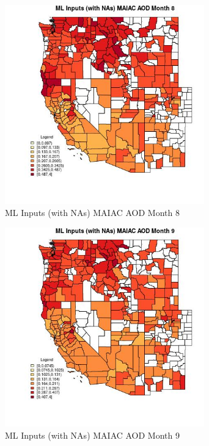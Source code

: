 \begin{figure} 
\centering  
\includegraphics[width=0.77\textwidth]{Code_Outputs/Report_ML_input_PM25_Step4_part_f_de_duplicated_aves_prioritize_24hr_obswNAs_CountyMAIAC_AODmedianMonth8.jpg} 
\caption{\label{fig:Report_ML_input_PM25_Step4_part_f_de_duplicated_aves_prioritize_24hr_obswNAsCountyMAIAC_AODmedianMonth8}ML Inputs (with NAs) MAIAC AOD Month 8} 
\end{figure} 
 

\clearpage 

\begin{figure} 
\centering  
\includegraphics[width=0.77\textwidth]{Code_Outputs/Report_ML_input_PM25_Step4_part_f_de_duplicated_aves_prioritize_24hr_obswNAs_CountyMAIAC_AODmedianMonth9.jpg} 
\caption{\label{fig:Report_ML_input_PM25_Step4_part_f_de_duplicated_aves_prioritize_24hr_obswNAsCountyMAIAC_AODmedianMonth9}ML Inputs (with NAs) MAIAC AOD Month 9} 
\end{figure} 
 

